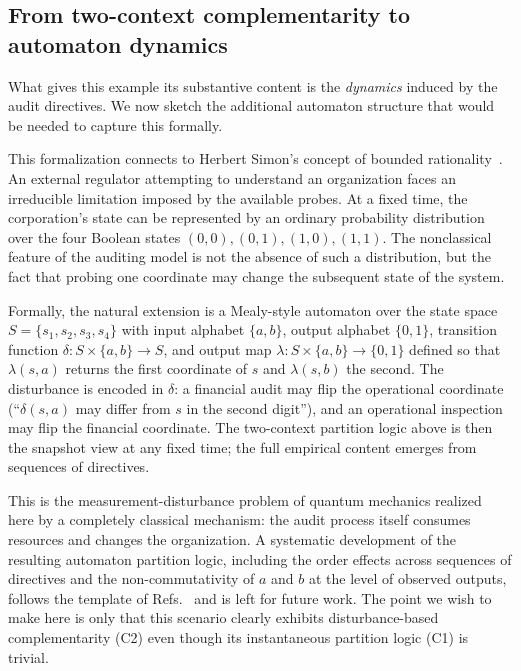 \documentclass[aps,pra,twocolumn,superscriptaddress,floatfix,longbibliography]{revtex4-2}
\begin{document}
\subsection{From two-context complementarity to automaton dynamics}
\label{sec:org-automaton}

What gives this example its substantive content is the
\emph{dynamics} induced by the audit directives. We now sketch the
additional automaton structure that would be needed to capture this
formally.

This formalization connects to Herbert Simon's concept of bounded
rationality~\cite{Simon1957}. An external regulator attempting to
understand an organization faces an irreducible limitation imposed by
the available probes. At a fixed time, the corporation's state can be
represented by an ordinary probability distribution over the four
Boolean states $(0,0),(0,1),(1,0),(1,1)$. The nonclassical feature of
the auditing model is not the absence of such a distribution, but the
fact that probing one coordinate may change the subsequent state of
the system.

Formally, the natural extension is a Mealy-style automaton over the
state space $S=\{s_1,s_2,s_3,s_4\}$ with input alphabet $\{a,b\}$,
output alphabet $\{0,1\}$, transition function $\delta\colon S\times
\{a,b\}\to S$, and output map $\lambda\colon S\times\{a,b\}\to\{0,1\}$
defined so that $\lambda(s,a)$ returns the first coordinate of $s$
and $\lambda(s,b)$ the second. The disturbance is encoded in
$\delta$: a financial audit may flip the operational coordinate
(``$\delta(s,a)$ may differ from $s$ in the second digit''), and an
operational inspection may flip the financial coordinate. The
two-context partition logic above is then the snapshot view at any
fixed time; the full empirical content emerges from sequences of
directives.

This is the measurement-disturbance problem of quantum mechanics
realized here by a completely classical mechanism: the audit process
itself consumes resources and changes the organization. A systematic
development of the resulting automaton partition logic, including
the order effects across sequences of directives and the
non-commutativity of $a$ and $b$ at the level of observed outputs,
follows the template of Refs.~\cite{schaller-92,svozil-2001-eua} and
is left for future work. The point we wish to make here is only that
this scenario clearly exhibits disturbance-based complementarity (C2)
even though its instantaneous partition logic (C1) is trivial.
\end{document}

